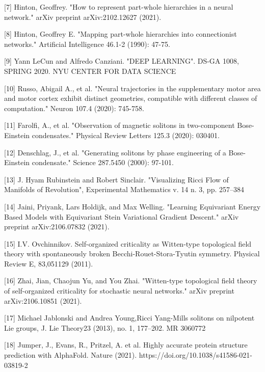 \documentclass{article}
\begin{document}
[7] Hinton, Geoffrey. "How to represent part-whole hierarchies in a neural network." arXiv preprint arXiv:2102.12627 (2021).

[8] Hinton, Geoffrey E. "Mapping part-whole hierarchies into connectionist networks." Artificial Intelligence 46.1-2 (1990): 47-75.

[9]  Yann LeCun  and Alfredo Canziani. "DEEP LEARNING". DS-GA 1008, SPRING 2020. NYU CENTER FOR DATA SCIENCE

[10] Russo, Abigail A., et al. "Neural trajectories in the supplementary motor area and motor cortex exhibit distinct geometries, compatible with different classes of computation." Neuron 107.4 (2020): 745-758.

[11] Farolfi, A., et al. "Observation of magnetic solitons in two-component Bose-Einstein condensates." Physical Review Letters 125.3 (2020): 030401.

[12] Denschlag, J., et al. "Generating solitons by phase engineering of a Bose-Einstein condensate." Science 287.5450 (2000): 97-101.

[13] J. Hyam Rubinstein and Robert Sinclair. "Visualizing Ricci Flow of Manifolds of Revolution", Experimental Mathematics v. 14 n. 3, pp. 257–384

[14] Jaini, Priyank, Lars Holdijk, and Max Welling. "Learning Equivariant Energy Based Models with Equivariant Stein Variational Gradient Descent." arXiv preprint arXiv:2106.07832 (2021).

[15] I.V. Ovchinnikov. Self-organized criticality as Witten-type topological field theory with spontaneously
broken Becchi-Rouet-Stora-Tyutin symmetry. Physical Review E, 83,051129 (2011).

[16] Zhai, Jian, Chaojun Yu, and You Zhai. "Witten-type topological field theory of self-organized criticality for stochastic neural networks." arXiv preprint arXiv:2106.10851 (2021).

[17] Michael Jablonski and Andrea Young,Ricci Yang-Mills solitons on nilpotent Lie groups, J. Lie Theory23 (2013), no. 1, 177–202. MR 3060772


[18] Jumper, J., Evans, R., Pritzel, A. et al. Highly accurate protein structure prediction with AlphaFold. Nature (2021). https://doi.org/10.1038/s41586-021-03819-2





\end{document}
